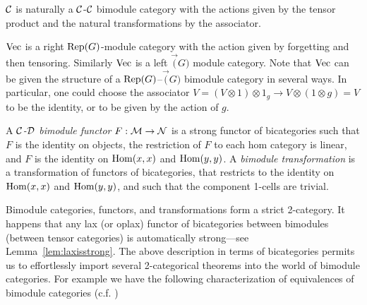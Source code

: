 \documentclass{amsart}
\begin{document}
\begin{example}
$\cC$ is naturally a $\cC$-$\cC$ bimodule category with the actions given by the tensor product and the natural transformations by the associator.
\end{example}

\begin{example}
$\Vec$ is a right $\Rep(G)$-module category with the action given by forgetting and then tensoring.  Similarly $\Vec$ is a left $\Vec(G)$ module category.  Note that $\Vec$ can be given the structure of a $\Rep(G)$--$\Vec(G)$ bimodule category in several ways.  In particular, one could choose the associator $V = (V \otimes 1) \otimes 1_g \rightarrow V \otimes (1 \otimes g) = V$ to be the identity, or to be given by the action of $g$.
\end{example}

\begin{definition}		
A {\em $\cC$-$\cD$ bimodule functor} $F:\cM \to \cN$ is a strong functor of bicategories such that 
		 $F$ is the identity on objects,
		  the restriction of $F$ to each hom category is linear,
		 and $F$ is the identity on $\Hom(x,x)$ and $\Hom(y,y)$.
	A {\em bimodule transformation} is a transformation of functors of bicategories, that restricts to the identity on $\Hom(x,x)$ and $\Hom(y,y)$, and such that the component 1-cells are trivial.  
\end{definition} %
	
%
\nid Bimodule categories, functors, and transformations form a strict 2-category.  %
It happens that any lax (or oplax) functor of bicategories between bimodules (between tensor categories) is automatically strong---see Lemma~\ref{lem:laxisstrong}. The above description in terms of bicategories permits us to effortlessly import several 2-categorical theorems into the world of bimodule categories. For example we have the following characterization of equivalences of bimodule categories (c.f. \cite{MR2664622})  
\end{document}
